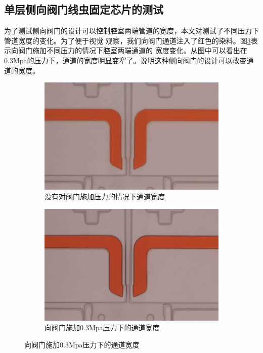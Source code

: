 \subsection{单层侧向阀门线虫固定芯片的测试}
	为了测试侧向阀门的设计可以控制腔室两端管道的宽度，本文对测试了不同压力下管道宽度的变化。为了便于视觉
	观察，我们向阀门通道注入了红色的染料。图\ref{fig:chap1:width}表示向阀门施加不同压力的情况下腔室两端通道的
	宽度变化。从图中可以看出在0.3Mpa的压力下，通道的宽度明显变窄了。说明这种侧向阀门的设计可以改变通道的宽度。
	\begin{figure}[!htp]
	  \centering
	  \begin{subfigure}{0.45\textwidth}
		\centering
		\includegraphics[width=1\linewidth]{figure/chap1/singlelayertest1.jpg}
		\caption{没有对阀门施加压力的情况下通道宽度}
		\label{fig:before}   
	  \end{subfigure}
		\hspace{1em}
	  \begin{subfigure}{0.45\textwidth}
		\centering
		\includegraphics[width=1\linewidth]{figure/chap1/singlelayertest2.jpg}
		\caption{向阀门施加0.3Mpa压力下的通道宽度}
		\label{fig:after}
	  \end{subfigure}
	  \label{fig:chap1:width}
	\end{figure}
	
